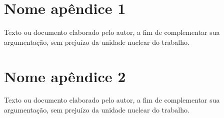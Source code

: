 
\chapter{Nome apêndice 1}

Texto ou documento elaborado pelo autor, a fim de complementar sua argumentação, sem prejuízo da unidade nuclear do trabalho. 

\chapter{Nome apêndice 2}

Texto ou documento elaborado pelo autor, a fim de complementar sua argumentação, sem prejuízo da unidade nuclear do trabalho. 


%

